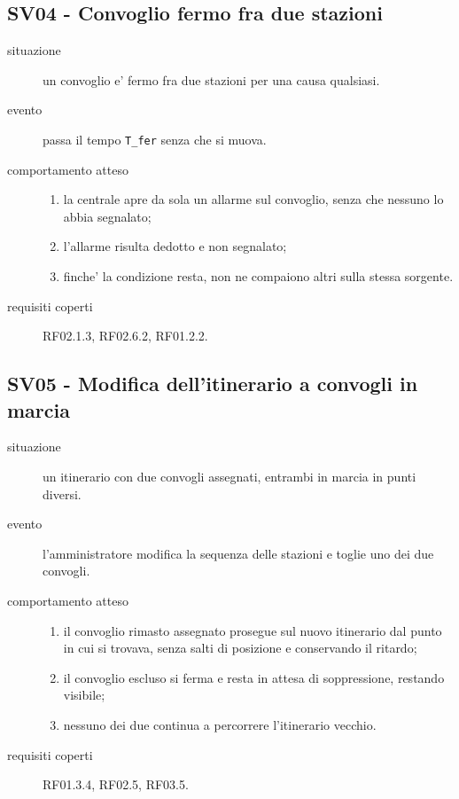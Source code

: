 \documentclass[11pt]{article}
\begin{document}
\subsection{SV04 - Convoglio fermo fra due stazioni}
\label{sec:org8da0278}

\begin{description}
\item[{situazione}] un convoglio e' fermo fra due stazioni per una causa qualsiasi.
\item[{evento}] passa il tempo \texttt{T\_fer} senza che si muova.
\item[{comportamento atteso}] \begin{enumerate}
\item la centrale apre da sola un allarme sul convoglio, senza che nessuno lo abbia segnalato;
\item l'allarme risulta dedotto e non segnalato;
\item finche' la condizione resta, non ne compaiono altri sulla stessa sorgente.
\end{enumerate}
\item[{requisiti coperti}] RF02.1.3, RF02.6.2, RF01.2.2.
\end{description}
\subsection{SV05 - Modifica dell'itinerario a convogli in marcia}
\label{sec:orgd79e15a}

\begin{description}
\item[{situazione}] un itinerario con due convogli assegnati, entrambi in marcia in punti diversi.
\item[{evento}] l'amministratore modifica la sequenza delle stazioni e toglie uno dei due convogli.
\item[{comportamento atteso}] \begin{enumerate}
\item il convoglio rimasto assegnato prosegue sul nuovo itinerario dal punto in cui si trovava, senza
salti di posizione e conservando il ritardo;
\item il convoglio escluso si ferma e resta in attesa di soppressione, restando visibile;
\item nessuno dei due continua a percorrere l'itinerario vecchio.
\end{enumerate}
\item[{requisiti coperti}] RF01.3.4, RF02.5, RF03.5.
\end{description}
\end{document}
